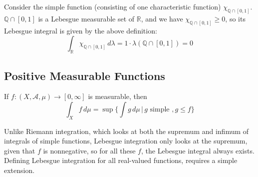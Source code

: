   \begin{example}
    Consider the simple function (consisting of one characteristic function) $\chi_{\mathbb{Q} \cap [0, 1]}$. $\mathbb{Q} \cap [0, 1]$ is a Lebesgue measurable set of $\mathbb{R}$, and we have $\chi_{\mathbb{Q} \cap [0, 1]} \geq 0$, so its Lebesgue integral is given by the above definition: 
    \begin{equation}
      \int_{\mathbb{R}} \chi_{\mathbb{Q} \cap [0, 1]} \, d\lambda = 1 \cdot \lambda(\mathbb{Q} \cap [0, 1]) = 0
    \end{equation}
  \end{example} 

\subsection{Positive Measurable Functions}

  \begin{definition}
    If $f: (X, \mathcal{A}, \mu) \longrightarrow [0, \infty]$ is measurable, then 
    \begin{equation}
      \int_X f \, d\mu = \sup \Big\{ \int g\, d\mu \,\Big|\, g \text{ simple }, g \leq f\Big\}
    \end{equation}
  \end{definition}

  Unlike Riemann integration, which looks at both the supremum and infimum of integrals of simple functions, Lebesgue integration only looks at the supremum, given that $f$ is nonnegative, so for all these $f$, the Lebesgue integral always exists. Defining Lebesgue integration for all real-valued functions, requires a simple extension. 


